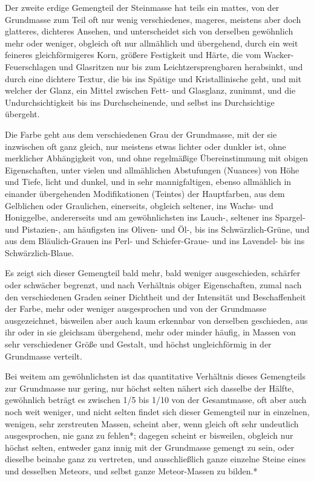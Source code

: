 \documentclass[a4paper, 11pt, oneside, german]{article}
\begin{document}
Der zweite erdige Gemengteil der Steinmasse hat teils ein mattes, von der Grundmasse zum Teil oft nur wenig verschiedenes, mageres, meistens aber doch glatteres, dichteres Ansehen, und unterscheidet sich von derselben gewöhnlich mehr oder weniger, obgleich oft nur allmählich und übergehend, durch ein weit feineres gleichförmigeres Korn, größere Festigkeit und Härte, die vom Wacker-Feuerschlagen und Glasritzen nur bis zum Leichtzersprengbaren herabsinkt, und durch eine dichtere Textur, die bis ins Spätige und Kristallinische geht, und mit welcher der Glanz, ein Mittel zwischen Fett- und Glasglanz, zunimmt, und die Undurchsichtigkeit bis ins Durchscheinende, und selbst ins Durchsichtige übergeht.

Die Farbe geht aus dem verschiedenen Grau der Grundmasse, mit der sie inzwischen oft ganz gleich, nur meistens etwas lichter oder dunkler ist, ohne merklicher Abhängigkeit von, und ohne regelmäßige Übereinstimmung mit obigen Eigenschaften, unter vielen und allmählichen Abstufungen (Nuances) von Höhe und Tiefe, licht und dunkel, und in sehr mannigfaltigen, ebenso allmählich in einander übergehenden Modifikationen (Teintes) der Hauptfarben, aus dem Gelblichen oder Graulichen, einerseits, obgleich seltener, ins Wachs- und Honiggelbe, andererseits und am gewöhnlichsten ins Lauch-, seltener ins Spargel- und Pistazien-, am häufigsten ins Oliven- und Öl-, bis ins Schwärzlich-Grüne, und aus dem Bläulich-Grauen ins Perl- und Schiefer-Graue- und ins Lavendel- bis ins Schwärzlich-Blaue.

Es zeigt sich dieser Gemengteil bald mehr, bald weniger ausgeschieden, schärfer oder schwächer begrenzt, und nach Verhältnis obiger Eigenschaften, zumal nach den verschiedenen Graden seiner Dichtheit und der Intensität und Beschaffenheit der Farbe, mehr oder weniger ausgesprochen und von der Grundmasse ausgezeichnet, bisweilen aber auch kaum erkennbar von derselben geschieden, aus ihr oder in sie gleichsam übergehend, mehr oder minder häufig, in Massen von sehr verschiedener Größe und Gestalt, und höchst ungleichförmig in der Grundmasse verteilt.

Bei weitem am gewöhnlichsten ist das quantitative Verhältnis dieses Gemengteils zur Grundmasse nur gering, nur höchst selten nähert sich dasselbe der Hälfte, gewöhnlich beträgt es zwischen 1/5 bis 1/10 von der Gesamtmasse, oft aber auch noch weit weniger, und nicht selten findet sich dieser Gemengteil nur in einzelnen, wenigen, sehr zerstreuten Massen, scheint aber, wenn gleich oft sehr undeutlich ausgesprochen, nie ganz zu fehlen*; dagegen scheint er bisweilen, obgleich nur höchst selten, entweder ganz innig mit der Grundmasse gemengt zu sein, oder dieselbe beinahe ganz zu vertreten, und ausschließlich ganze einzelne Steine eines und desselben Meteors, und selbst ganze Meteor-Massen zu bilden.*
\end{document}
